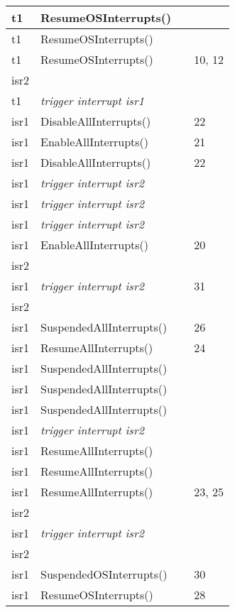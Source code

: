 \documentclass[10pt]{article}
\newlength{\Li}\settowidth{\Li}{Running}
\newlength{\Lii}\setlength{\Lii}{7cm}
\newlength{\Liiii}\setlength{\Liiii}{0.9cm}
\newlength{\Liii}\setlength{\Liii}{\textwidth} \addtolength{\Liii}{-\Li} \addtolength{\Liii}{-\Lii} \addtolength{\Liii}{-\Liiii}
\begin{document}
\begin{supertabular}{|p{\Li}|p{\Lii}|p{\Liii}|p{\Liiii}|}
	t1 	& ResumeOSInterrupts()			&  			& \\ \hline 
	t1 	& ResumeOSInterrupts()			&  			& \\ \hline 
	t1 	& ResumeOSInterrupts()			&  			& 10, 12 \\ \hline 
	isr2	& 							& 			&  \\ \hline
	t1	& \textit{trigger interrupt isr1}		& 		 	&  \\ \hline 
	isr1 	& DisableAllInterrupts()			&  			& 22 \\ \hline 
	isr1 	& EnableAllInterrupts()			&  			& 21 \\ \hline
	isr1 	& DisableAllInterrupts()			&  			& 22 \\ \hline 
	isr1 	& \textit{trigger interrupt isr2}		& 		 	&  \\ \hline
	isr1 	& \textit{trigger interrupt isr2}		& 		 	&  \\ \hline 
	isr1 	& \textit{trigger interrupt isr2}		& 		 	&  \\ \hline 
	isr1 	& EnableAllInterrupts()			&  			& 20 \\ \hline
	isr2	& 							& 			&  \\ \hline
	isr1	& \textit{trigger interrupt isr2}		& 		 	& 31 \\ \hline 
	isr2	&							&			&  \\ \hline
	isr1 	& SuspendedAllInterrupts()		&  			& 26 \\ \hline 
	isr1 	& ResumeAllInterrupts()			&  			& 24 \\ \hline 
	isr1 	& SuspendedAllInterrupts()		&  			&  \\ \hline 
	isr1 	& SuspendedAllInterrupts()		&  			&  \\ \hline 
	isr1 	& SuspendedAllInterrupts()		&  			&  \\ \hline 
	isr1 	& \textit{trigger interrupt isr2}		& 		 	&  \\ \hline 
	isr1 	& ResumeAllInterrupts()			&  			&  \\ \hline 
	isr1 	& ResumeAllInterrupts()			&  			&  \\ \hline 
	isr1 	& ResumeAllInterrupts()			&  			& 23, 25 \\ \hline 
	isr2	& 							& 			&  \\ \hline
	isr1	& \textit{trigger interrupt isr2}		& 		 	&  \\ \hline 
	isr2	&							&			&  \\ \hline
	isr1 	& SuspendedOSInterrupts()		&  			& 30 \\ \hline 
	isr1 	& ResumeOSInterrupts()			&  			& 28 \\ \hline 

\end{supertabular}
\end{document}

